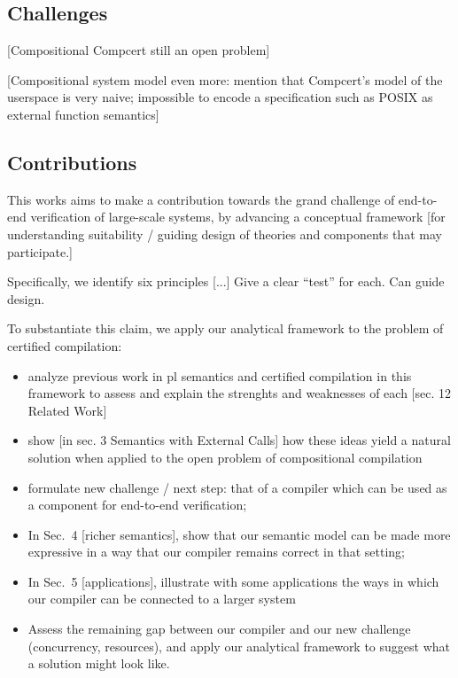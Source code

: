 \documentclass[sigplan,10pt,review,anonymous]{acmart}
\begin{document}

\subsection{Challenges} %

[Compositional Compcert still an open problem]

[Compositional system model even more:
mention that Compcert's model of the userspace is very naive;
impossible to encode a specification such as POSIX
as external function semantics]


\subsection{Contributions} %

This works aims to make a contribution
towards the grand challenge of end-to-end verification
of large-scale systems,
by advancing a conceptual framework
[for understanding suitability / guiding design
of theories and components that may participate.]

Specifically,
we identify six principles [...]
Give a clear ``test'' for each.
Can guide design.

To substantiate this claim,
we apply our analytical framework to the problem of certified compilation:
\begin{itemize}
\item analyze previous work in pl semantics and certified compilation
  in this framework to assess and explain the strenghts and weaknesses of each
  [sec. 12 Related Work]
\item show [in sec. 3 Semantics with External Calls]
  how these ideas yield a natural solution
  when applied to the open problem of compositional compilation
\item formulate new challenge / next step:
  that of a compiler which can be used as a component
  for end-to-end verification;
\item In Sec.~4 [richer semantics],
  show that our semantic model can be made more expressive
  in a way that our compiler remains correct in that setting;
\item In Sec.~5 [applications],
  illustrate with some applications
  the ways in which our compiler can be connected
  to a larger system
\item Assess the remaining gap between our compiler
  and our new challenge (concurrency, resources),
  and apply our analytical framework to suggest
  what a solution might look like.
\end{itemize}
\end{document}
